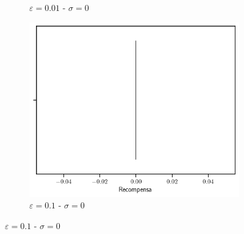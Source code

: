 \documentclass[12pt]{article}
\begin{document}
\begin{figure}[]
\begin{subfigure}[H]{0.3\textwidth}
            \caption{$\varepsilon=0.01$ - $\sigma=0$}
            \label{fig:estimations_1}
        \end{subfigure}
        \begin{subfigure}[H]{0.3\textwidth}
            \includegraphics[width=\textwidth]{../img/values_sigma_0_epsilon_0.1}
            \caption{$\varepsilon=0.1$ - $\sigma=0$}
            \label{fig:estimations_2}
        \end{subfigure}


\end{figure}
\end{document}
